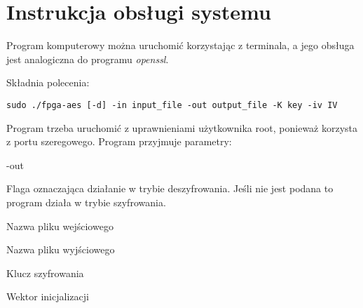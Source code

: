 \section{Instrukcja obsługi systemu}
Program komputerowy można uruchomić korzystając z terminala, a jego obsługa jest analogiczna do programu \textit{openssl}.

Składnia polecenia:
\begin{verbatim}
sudo ./fpga-aes [-d] -in input_file -out output_file -K key -iv IV
\end{verbatim}

Program trzeba uruchomić z uprawnieniami użytkownika root, ponieważ korzysta z portu szeregowego. Program przyjmuje parametry:
\begin{interface}{-out}
\item[\textbf{-d}]Flaga oznaczająca działanie w trybie deszyfrowania. Jeśli nie jest podana to program działa w trybie szyfrowania.
\item[\textbf{-in}]Nazwa pliku wejściowego
\item[\textbf{-out}]Nazwa pliku wyjściowego
\item[\textbf{-K}]Klucz szyfrowania
\item[\textbf{-iv}]Wektor inicjalizacji
\end{interface}